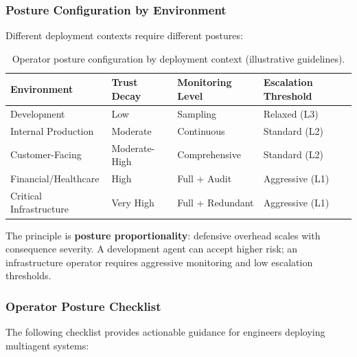 \documentclass[
]{article}
\begin{document}
\subsubsection{Posture Configuration by
Environment}\label{posture-configuration-by-environment}

Different deployment contexts require different postures:

\begin{table}[htbp]
\centering
\caption{Operator posture configuration by deployment context (illustrative guidelines).}
\label{tab:posture-config}
\begin{tabular}{@{}llll@{}}
\toprule
Environment & Trust Decay & Monitoring Level & Escalation Threshold \\
\midrule
Development & Low & Sampling & Relaxed (L3) \\
Internal Production & Moderate & Continuous & Standard (L2) \\
Customer-Facing & Moderate-High & Comprehensive & Standard (L2) \\
Financial/Healthcare & High & Full + Audit & Aggressive (L1) \\
Critical Infrastructure & Very High & Full + Redundant & Aggressive (L1) \\
\bottomrule
\end{tabular}
\end{table}

The principle is \textbf{posture proportionality}: defensive overhead
scales with consequence severity. A development agent can accept higher
risk; an infrastructure operator requires aggressive monitoring and low
escalation thresholds.

\subsubsection{Operator Posture
Checklist}\label{operator-posture-checklist}

The following checklist provides actionable guidance for engineers
deploying multiagent systems:
\end{document}
